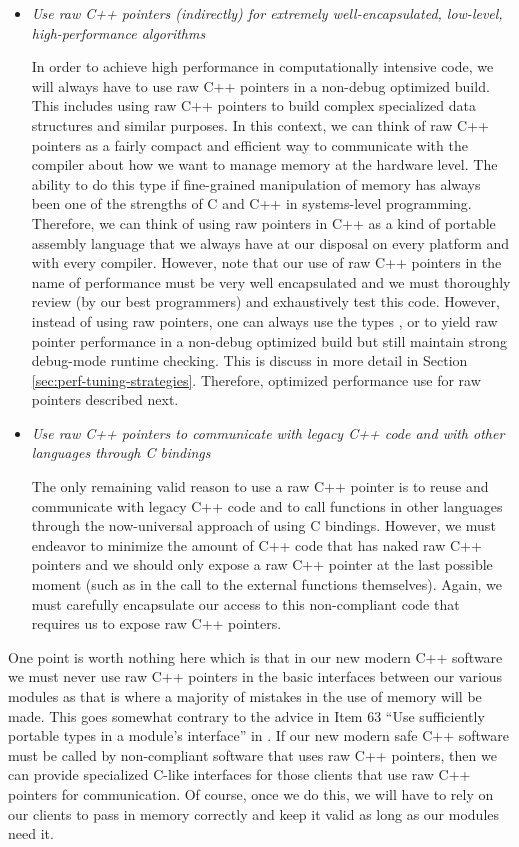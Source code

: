 \documentclass[pdf,ps2pdf,11pt]{SANDreport}
\begin{document}
\begin{itemize}

{}\item{}\textit{Use raw C++ pointers (indirectly) for extremely
well-encapsulated, low-level, high-performance algorithms}

In order to achieve high performance in computationally intensive
code, we will always have to use raw C++ pointers in a non-debug
optimized build.  This includes using raw C++ pointers to build
complex specialized data structures and similar purposes.  In this
context, we can think of raw C++ pointers as a fairly compact and
efficient way to communicate with the compiler about how we want to
manage memory at the hardware level.  The ability to do this type if
fine-grained manipulation of memory has always been one of the
strengths of C and C++ in systems-level programming.  Therefore, we
can think of using raw pointers in C++ as a kind of portable assembly
language that we always have at our disposal on every platform and
with every compiler.  However, note that our use of raw C++ pointers
in the name of performance must be very well encapsulated and we must
thoroughly review (by our best programmers) and exhaustively test this
code.  However, instead of using raw pointers, one can always use the
types {}, {} or
{} to yield raw pointer performance
in a non-debug optimized build but still maintain strong debug-mode
runtime checking.  This is discuss in more detail in Section
{}\ref{sec:perf-tuning-strategies}.  Therefore, optimized performance
use for raw pointers described next.

{}\item{}\textit{Use raw C++ pointers to communicate with legacy C++
code and with other languages through C bindings}

The only remaining valid reason to use a raw C++ pointer is to reuse
and communicate with legacy C++ code and to call functions in other
languages through the now-universal approach of using C bindings.
However, we must endeavor to minimize the amount of C++ code that has
naked raw C++ pointers and we should only expose a raw C++ pointer at
the last possible moment (such as in the call to the external
functions themselves).  Again, we must carefully encapsulate our
access to this non-compliant code that requires us to expose raw C++
pointers.

\end{itemize}

One point is worth nothing here which is that in our new modern C++
software we must never use raw C++ pointers in the basic interfaces
between our various modules as that is where a majority of mistakes in
the use of memory will be made.  This goes somewhat contrary to the
advice in Item 63 ``Use sufficiently portable types in a module's
interface'' in {}\cite{C++CodingStandards05}.  If our new modern safe
C++ software must be called by non-compliant software that uses raw
C++ pointers, then we can provide specialized C-like interfaces for
those clients that use raw C++ pointers for communication.  Of course,
once we do this, we will have to rely on our clients to pass in memory
correctly and keep it valid as long as our modules need it.
\end{document}
